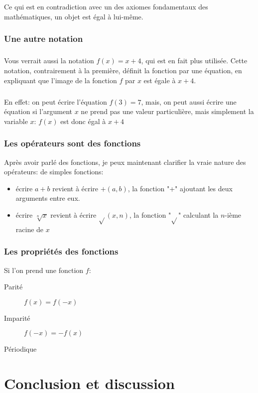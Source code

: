 \documentclass[a4paper]{book}
\begin{document}
    Ce qui est en contradiction avec un des axiomes fondamentaux des mathématiques, un objet est égal à lui-même.
    
    \subsection{Une autre notation}
    \paragraph{}
    Vous verrait aussi la notation $f(x) = x + 4$, qui est en fait plus utilisée. Cette notation, contrairement à la première, définit la fonction par une équation, en expliquant que l'image de la fonction $f$ par $x$ est égale à $x + 4$.
    \paragraph{}
    En effet: on peut écrire l'équation $f(3) = 7$, mais, on peut aussi écrire une équation si l'argument $x$ ne prend pas une valeur particulière, mais simplement la variable $x$: $f(x)$ est donc égal à $x + 4$
    
    \subsection{Les opérateurs sont des fonctions}
    Après avoir parlé des fonctions, je peux maintenant clarifier la vraie nature des opérateurs: de simples fonctions:
    
    \begin{itemize}
        \item écrire $a + b$ revient à écrire $+(a, b)$, la fonction "+" ajoutant les deux arguments entre eux.
        \item écrire $\sqrt[n]{x}$ revient à écrire $\sqrt{}(x, n)$, la fonction "$\sqrt{}$" calculant la $n$-ième racine de $x$
    \end{itemize}
    
    \subsection{Les propriétés des fonctions}
    
    Si l'on prend une fonction $f$:
    \begin{description}
    \item[Parité] $f(x) = f(-x)$
    \item[Imparité] $f(-x) = -f(x)$
    \item[Périodique] 
        
    \end{description}
 
    
    \backmatter
 
    \chapter{Conclusion et discussion}
 
    
    \tableofcontents    
    \listoffigures        %
    \listoftables        %
 
\end{document}

